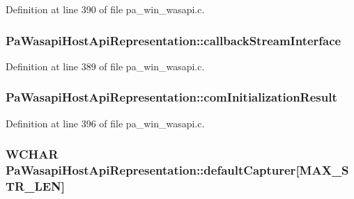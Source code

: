 Definition at line 390 of file pa\+\_\+win\+\_\+wasapi.\+c.

\subsubsection[{\texorpdfstring{callback\+Stream\+Interface}{callbackStreamInterface}}]{ Pa\+Wasapi\+Host\+Api\+Representation\+::callback\+Stream\+Interface}\hypertarget{struct_pa_wasapi_host_api_representation_ab0a50b8957abc26a47c113ed33311a53}{}\label{struct_pa_wasapi_host_api_representation_ab0a50b8957abc26a47c113ed33311a53}


Definition at line 389 of file pa\+\_\+win\+\_\+wasapi.\+c.

\subsubsection[{\texorpdfstring{com\+Initialization\+Result}{comInitializationResult}}]{ Pa\+Wasapi\+Host\+Api\+Representation\+::com\+Initialization\+Result}\hypertarget{struct_pa_wasapi_host_api_representation_aaaf9e88d3972658267845c5df3f1bd2b}{}\label{struct_pa_wasapi_host_api_representation_aaaf9e88d3972658267845c5df3f1bd2b}


Definition at line 396 of file pa\+\_\+win\+\_\+wasapi.\+c.

\subsubsection[{\texorpdfstring{default\+Capturer}{defaultCapturer}}]{\setlength{\rightskip}{0pt plus 5cm}W\+C\+H\+AR Pa\+Wasapi\+Host\+Api\+Representation\+::default\+Capturer\mbox{[}{\bf M\+A\+X\+\_\+\+S\+T\+R\+\_\+\+L\+EN}\mbox{]}}\hypertarget{struct_pa_wasapi_host_api_representation_a477fff22f034072694329b480fb8d8b8}{}\label{struct_pa_wasapi_host_api_representation_a477fff22f034072694329b480fb8d8b8}



